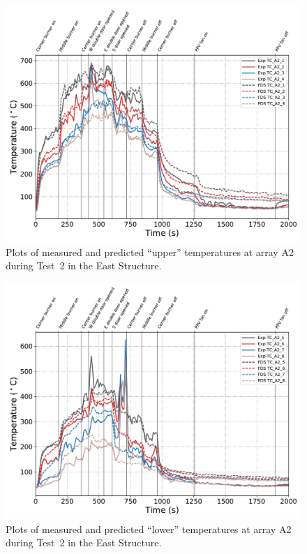 \clearpage 
\begin{figure}[p]
	\centering
	\includegraphics[width=\columnwidth]{Figures/Plots/Validation/Temperature/Test_2_TC_A2_upper}
	\caption{Plots of measured and predicted ``upper'' temperatures at array A2 during Test~2 in the East Structure.}
	\label{fig:TCA2_upper_data_Test2}
\end{figure}
\begin{figure}[p]
	\centering
	\includegraphics[width=\columnwidth]{Figures/Plots/Validation/Temperature/Test_2_TC_A2_lower}
	\caption{Plots of measured and predicted ``lower'' temperatures at array A2 during Test~2 in the East Structure.}
	\label{fig:TCA2_lower_data_Test2}
\end{figure}

